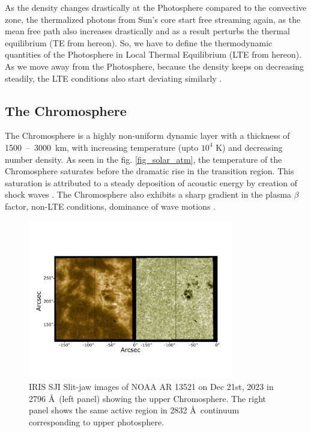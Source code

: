 As the density changes drastically at the Photosphere compared to the convective zone, the thermalized photons from Sun's core start free streaming again, as the mean free path also increases drastically and as a result perturbs the thermal equilibrium (TE from hereon). So, we have to define the thermodynamic quantities of the Photosphere in Local Thermal Equilibrium (LTE from hereon). As we move away from the Photosphere, because the density keeps on decreasing steadily, the LTE conditions also start deviating similarly \citep{philips08}.

\subsection{The Chromosphere}\label{chromosphere}

The Chromosphere is a highly non-uniform dynamic layer with a thickness of 1500~--~3000~km, with increasing temperature (upto $10^{4}$ K) and decreasing number density. As seen in the fig. \ref{fig_solar_atm}, the temperature of the Chromosphere saturates before the dramatic rise in the transition region. This saturation is attributed to a steady deposition of acoustic energy by creation of shock waves \citep{carlsson07}. The Chromosphere also exhibits a sharp gradient in the plasma $\beta$ factor, non-LTE conditions, dominance of wave motions . 

\begin{figure}[ht!]
    \centering
    \includegraphics[trim={1cm 3cm 2cm 5cm},clip,width=0.8\textwidth]{Figures/sji_images.pdf}
    \caption{IRIS SJI Slit-jaw images of NOAA AR 13521 on Dec 21st, 2023 in  2796 {\AA}~(left panel) showing the upper Chromosphere. The right panel shows the same active region in 2832 {\AA}~continuum corresponding to upper photosphere.}
    \label{fig:sji_features}
\end{figure}

